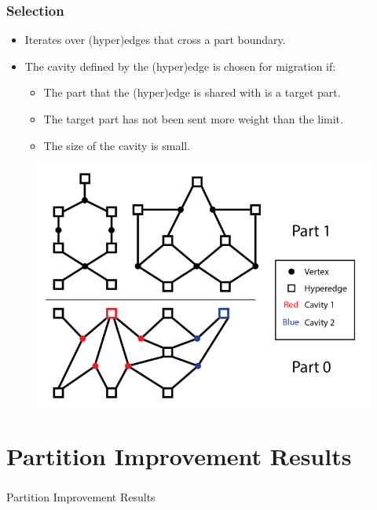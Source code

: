 \documentclass{beamer}
\begin{document}
\begin{frame}
  \frametitle{Selection}
  \begin{minipage}{.5\textwidth}
    \begin{itemize}
    \item Iterates over (hyper)edges that cross a part boundary.
      
    \item The cavity defined by the (hyper)edge is chosen for migration if:
      \begin{itemize}
      \item The part that the (hyper)edge is shared with is a target part.
      \item The target part has not been sent more weight than the limit.
      \item The size of the cavity is small.
      \end{itemize}
    \end{itemize}
  \end{minipage}
  \begin{minipage}{.45\textwidth}

    \begin{figure}
      \centering
      \includegraphics[width=\textwidth]{figures/PartBoundary.png}
    \end{figure}
  \end{minipage}
\end{frame}

\section{Partition Improvement Results}
\begin{frame}
  \frametitle{}
  \center \huge{Partition Improvement Results}
\end{frame}
\end{document}
